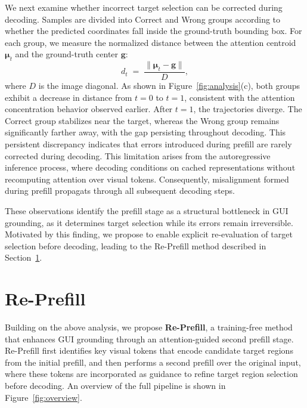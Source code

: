 \documentclass{article}
\begin{document}
We next examine whether incorrect target selection can be corrected during decoding. Samples are divided into Correct and Wrong groups according to whether the predicted coordinates fall inside the ground-truth bounding box. For each group, we measure the normalized distance between the attention centroid $\boldsymbol{\mu}_t$ and the ground-truth center $\mathbf{g}$:
\begin{equation}
d_t \;=\; \frac{\bigl\|\boldsymbol{\mu}_t - \mathbf{g}\bigr\|}{D},
\end{equation}
where $D$ is the image diagonal.
As shown in Figure~\ref{fig:analysis}(c), both groups exhibit a decrease in distance from $t=0$ to $t=1$, consistent with the attention concentration behavior observed earlier. After $t=1$, the trajectories diverge. The Correct group stabilizes near the target, whereas the Wrong group remains significantly farther away, with the gap persisting throughout decoding.
This persistent discrepancy indicates that errors introduced during prefill are rarely corrected during decoding. 
This limitation arises from the autoregressive inference process, where decoding conditions on cached representations without recomputing attention over visual tokens. Consequently, misalignment formed during prefill propagats through all subsequent decoding steps.

These observations identify the prefill stage as a structural bottleneck in GUI grounding, as it determines target selection while its errors remain irreversible. Motivated by this finding, we propose to enable explicit re-evaluation of target selection before decoding, leading to the Re-Prefill method described in Section~\ref{sec:reprefill}.

\section{Re-Prefill}
\label{sec:reprefill}

Building on the above analysis, we propose \textbf{Re-Prefill}, a training-free method that enhances GUI grounding through an attention-guided second prefill stage. 
Re-Prefill first identifies key visual tokens that encode candidate target regions from the initial prefill, and then performs a second prefill over the original input, where these tokens are incorporated as guidance to refine target region selection before decoding.
An overview of the full pipeline is shown in Figure~\ref{fig:overview}.
\end{document}
